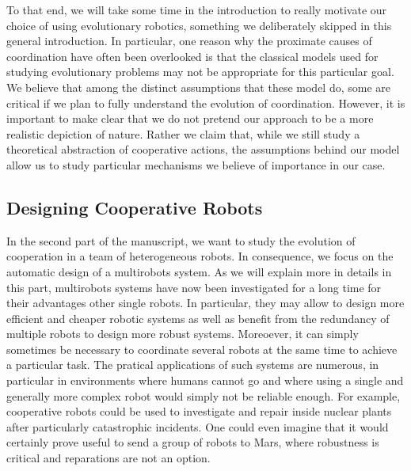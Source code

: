 
    To that end, we will take some time in the introduction to really motivate our choice of using evolutionary robotics, something we deliberately skipped in this general introduction. In particular, one reason why the proximate causes of coordination have often been overlooked is that the classical models used for studying evolutionary problems may not be appropriate for this particular goal. We believe that among the distinct assumptions that these model do, some are critical if we plan to fully understand the evolution of coordination. However, it is important to make clear that we do not pretend our approach to be a more realistic depiction of nature. Rather we claim that, while we still study a theoretical abstraction of cooperative actions, the assumptions behind our model allow us to study particular mechanisms we believe of importance in our case.


  \subsection{Designing Cooperative Robots}

    In the second part of the manuscript, we want to study the evolution of cooperation in a team of heterogeneous robots. In consequence, we focus on the automatic design of a multirobots system. As we will explain more in details in this part, multirobots systems have now been investigated for a long time for their advantages other single robots. In particular, they may allow to design more efficient and cheaper robotic systems as well as benefit from the redundancy of multiple robots to design more robust systems. Moreoever, it can simply sometimes be necessary to coordinate several robots at the same time to achieve a particular task. The pratical applications of such systems are numerous, in particular in environments where humans cannot go and where using a single and generally more complex robot would simply not be reliable enough. For example, cooperative robots could be used to investigate and repair inside nuclear plants after particularly catastrophic incidents. One could even imagine that it would certainly prove useful to send a group of robots to Mars, where robustness is critical and reparations are not an option.

